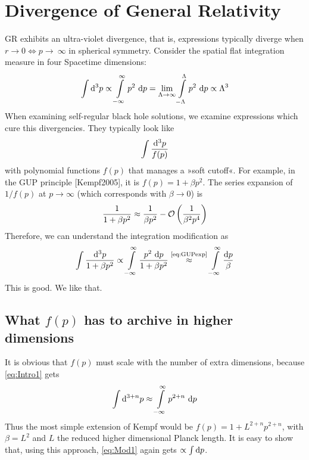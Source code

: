 \documentclass[10pt,a4paper, fleqn]{article}
\begin{document}
\section{Divergence of General Relativity}
GR exhibits an ultra-violet divergence, that is, expressions
typically diverge when $r\to 0 \Leftrightarrow p \to~\infty$
in spherical symmetry. Consider the spatial flat integration measure in four Spacetime dimensions:
\begin{equation} \label{eq:Intro1}
\int \mathrm{d}^3 p \propto \int \limits_{-\infty}^{\infty} p^2~\mathrm{d} p
= \lim_{\Lambda \to \infty} \int \limits_{-\Lambda}^\Lambda p^2~\mathrm{d} p
\propto \Lambda^3
\end{equation}
When examining self-regular black hole solutions, we examine expressions which cure this divergencies. They typically look like
\begin{equation}
\int \frac{ \mathrm{d}^3 p }{ f(p) }
\end{equation}
with polynomial functions $f(p)$ that manages a »soft cutoff«. For example, in the GUP principle [Kempf2005], it is $f(p) = 1 + \beta p^2$. The series expansion of $1/f(p)$ at $p\to\infty$ (which corresponds with $\beta \to 0$) is
\begin{equation} \label{eq:GUPexp}
\frac{1}{1 + \beta p^2} \approx \frac{1}{\beta p^2} 
- {\cal O}\left( \frac{1}{\beta^2 p^4} \right)
\end{equation}
Therefore, we can understand the integration modification as
\begin{equation} \label{eq:Mod1}
\int \frac{ \mathrm{d}^3 p }{ 1 + \beta p^2}
\propto
\int \limits_{-\infty}^{\infty} \frac{ p^2~\mathrm{d} p }{ 1 + \beta p^2}
\stackrel{\text{\eqref{eq:GUPexp}}}{\approx}
\int \limits_{-\infty}^{\infty} \frac{\mathrm{d} p}{\beta}
\end{equation}
This is good. We like that.

\subsection{What $f(p)$ has to archive in higher dimensions}
It is obvious that $f(p)$ must scale with the number of extra dimensions, because \eqref{eq:Intro1} gets
\begin{equation}
\int \mathrm{d}^{3+n} p
\approx \int \limits_{-\infty}^\infty
p^{2+n}~\mathrm{d} p
\end{equation}
Thus the most simple extension of Kempf would be $f(p) = 1 + L^{2+n} p^{2+n}$, with $\beta = L^2$ and $L$ the reduced higher dimensional Planck length. It is easy to show that, using this approach, \eqref{eq:Mod1} again gets $\propto \int \mathrm{d} p$.
\end{document}
